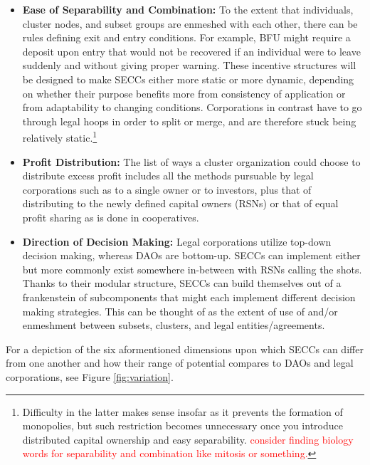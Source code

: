 \documentclass{article}[10pt]
\begin{document}
\begin{itemize}
    \item \textbf{Ease of Separability and Combination:} 
    To the extent that individuals, cluster nodes, and subset groups are enmeshed with each other, there can be rules defining exit and entry conditions.
    For example, BFU might require a deposit upon entry that would not be recovered if an individual were to leave suddenly and without giving proper warning.
    These incentive structures will be designed to make SECCs either more static or more dynamic, depending on whether their purpose benefits more from consistency of application or from adaptability to changing conditions.
    Corporations in contrast have to go through legal hoops in order to split or merge, and are therefore stuck being relatively static.\footnote{
        Difficulty in the latter makes sense insofar as it prevents the formation of monopolies, but such restriction becomes unnecessary once you introduce distributed capital ownership and easy separability.
        \textcolor{red}{consider finding biology words for separability and combination like mitosis or something.}}

    \item \textbf{Profit Distribution:}
    The list of ways a cluster organization could choose to distribute excess profit includes all the methods pursuable by legal corporations such as to a single owner or to investors, plus that of distributing to the newly defined capital owners (RSNs) or that of equal profit sharing as is done in cooperatives.

    \item \textbf{Direction of Decision Making:}
    Legal corporations utilize top-down decision making, whereas DAOs are bottom-up.
    SECCs can implement either but more commonly exist somewhere in-between with RSNs calling the shots.
    Thanks to their modular structure, SECCs can build themselves out of a frankenstein of subcomponents that might each implement different decision making strategies.
    This can be thought of as the extent of use of and/or enmeshment between subsets, clusters, and legal entities/agreements.
\end{itemize}

\noindent For a depiction of the six aformentioned dimensions upon which SECCs can differ from one another and how their range of potential compares to DAOs and legal corporations, see Figure \ref{fig:variation}.\par
\end{document}
